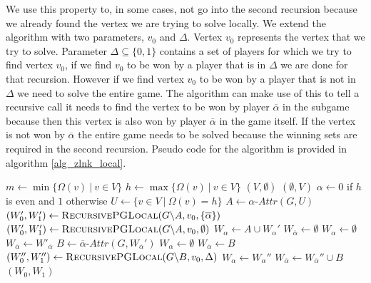 We use this property to, in some cases, not go into the second recursion because we already found the vertex we are trying to solve locally. We extend the algorithm with two parameters, $v_0$ and $\Delta$. Vertex $v_0$ represents the vertex that we try to solve. Parameter $\Delta \subseteq \{0,1\}$ contains a set of players for which we try to find vertex $v_0$, if we find $v_0$ to be won by a player that is in $\Delta$ we are done for that recursion. However if we find vertex $v_0$ to be won by a player that is not in $\Delta$ we need to solve the entire game. The algorithm can make use of this to tell a recursive call it needs to find the vertex to be won by player $\overline{\alpha}$ in the subgame because then this vertex is also won by player $\overline{\alpha}$ in the game itself. If the vertex is not won by $\overline{\alpha}$ the entire game needs to be solved because the winning sets are required in the second recursion. Pseudo code for the algorithm is provided in algorithm \ref{alg_zlnk_local}.
\begin{algorithm}
	\caption{$\textsc{RecursivePGLocal}(\textit{PG } G = (V,V_0,V_1, E, \Omega),v_0,\Delta)$}
	\label{alg_zlnk_local}
	\begin{algorithmic}[1]
		\State $m \gets \min\{ \Omega(v)\ |\ v \in V\}$
		\State $h \gets\max\{ \Omega(v)\ |\ v \in V\}$
		\State \Return $(V,\emptyset)$
		\Else
		\State \Return $(\emptyset, V)$
		\EndIf
		\EndIf
		\State $\alpha \gets 0$ if $h$ is even and $1$ otherwise
		\State $U \gets \{v \in V\ |\ \Omega(v) = h\}$
		\State $A \gets \alpha\textit{-Attr}(G, U)$
		\If{$\overline{\alpha} \in \Delta$}
		\State $(W_0', W_1') \gets \textsc{RecursivePGLocal}(G \backslash A,v_0,\{\overline{\alpha}\})$
		\Else
		\State $(W_0', W_1') \gets \textsc{RecursivePGLocal}(G \backslash A,v_0,\emptyset)$
		\EndIf
		\State $W_\alpha \gets A \cup W_\alpha'$
		\State $W_{\overline{\alpha}} \gets \emptyset$
		\Else
		\State $W_\alpha \gets \emptyset$
		\State $W_{\overline{\alpha}} \gets W'_{\overline{\alpha}}$
		\Else
		\State $B \gets \overline{\alpha}\textit{-Attr}(G,W_{\overline{\alpha}}')$
		\State $W_\alpha \gets \emptyset$
		\State $W_{\overline{\alpha}} \gets B$
		\Else
		\State $(W_0'', W_1'') \gets \textsc{RecursivePGLocal}(G \backslash B,v_0,\Delta)$
		\State $W_\alpha \gets W_\alpha''$
		\State $W_{\overline{\alpha}} \gets W_{\overline{\alpha}}'' \cup B$
		\EndIf
		\EndIf
		\EndIf
		\State \Return $(W_0, W_1)$
	\end{algorithmic}
\end{algorithm}

